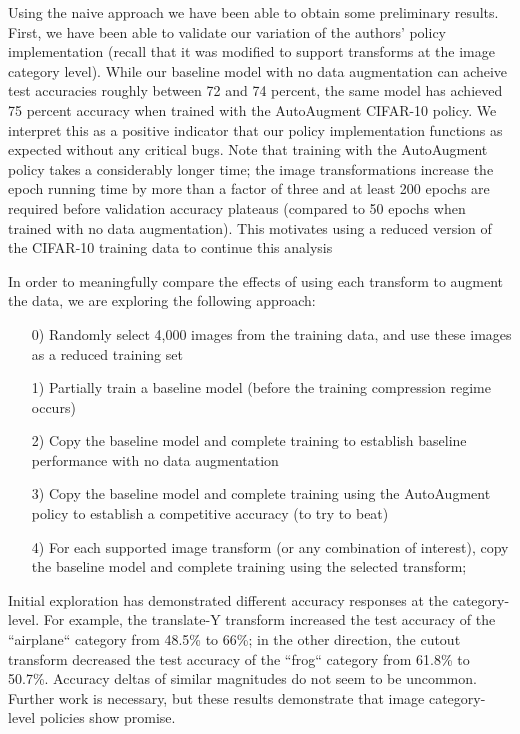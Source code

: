 \documentclass[10pt,twocolumn,letterpaper]{article}
\begin{document}
	Using the naive approach we have been able to obtain some preliminary results. First, we have been able to validate our variation of the authors' policy implementation (recall that it was modified to support transforms at the image category level). While our baseline model with no data augmentation can acheive test accuracies roughly between 72 and 74 percent, the same model has achieved 75 percent accuracy when trained with the AutoAugment CIFAR-10 policy. We interpret this as a positive indicator that our policy implementation functions as expected without any critical bugs. Note that training with the AutoAugment policy takes a considerably longer time; the image transformations increase the epoch running time by more than a factor of three and at least 200 epochs are required before validation accuracy plateaus (compared to 50 epochs when trained with no data augmentation). This motivates using a reduced version of the CIFAR-10 training data to continue this analysis
	
	In order to meaningfully compare the effects of using each transform to augment the data, we are exploring the following approach:
	
	\begin{enumerate}
		\item[0)]
			Randomly select 4,000 images from the training data, and use these images as a reduced training set
		
		\item[1)]
			Partially train a baseline model (before the training compression regime occurs)
			
		\item[2)]
			Copy the baseline model and complete training to establish baseline performance with no data augmentation
			
		\item[3)]
			Copy the baseline model and complete training using the AutoAugment policy to establish a competitive accuracy (to try to beat)
			
		\item[4)]
			For each supported image transform (or any combination of interest), copy the baseline model and complete training using the selected transform;
			
	\end{enumerate}
	
	Initial exploration has demonstrated different accuracy responses at the category-level. For example, the translate-Y transform increased the test accuracy of the ``airplane`` category from 48.5\% to 66\%; in the other direction, the cutout transform decreased the test accuracy of the ``frog`` category from 61.8\% to 50.7\%. Accuracy deltas of similar magnitudes do not seem to be uncommon. Further work is necessary, but these results demonstrate that image category-level policies show promise. 
\end{document}
